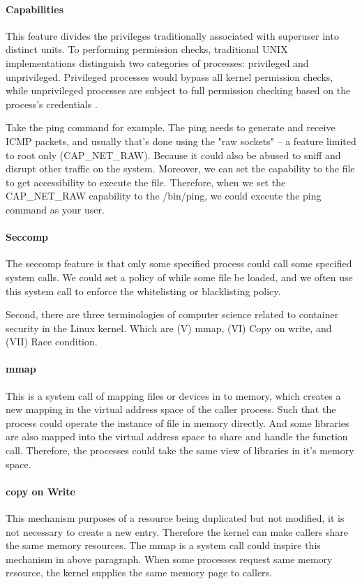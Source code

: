 \documentclass[12pt,a4paper]{article}
\begin{document}
\paragraph{Capabilities}
This feature divides the privileges traditionally associated with superuser into
distinct units. To performing permission checks, traditional UNIX
implementations distinguish two categories of processes: privileged and unprivileged.
Privileged processes would bypass all kernel permission checks, while unprivileged
processes are subject to full permission checking based on the process's credentials
\cite{capabilities}.

Take the ping command for example. The ping needs to generate and receive ICMP packets,
and usually that's done using the "raw sockets" – a feature limited to root only
(CAP\_NET\_RAW). Because it could also be abused to sniff and disrupt other traffic
on the system. Moreover, we can set the capability to the file to get accessibility
to execute the file.
Therefore, when we set the CAP\_NET\_RAW capability to the /bin/ping, we could execute
the ping command as your user.

\paragraph{Seccomp}
The seccomp feature is that only some specified process could call some specified
system calls. We could set a policy of while some file be loaded, and we often use
this system call to enforce the whitelisting or blacklisting policy.

Second, there are three terminologies of computer science related to container
security in the Linux kernel. Which are (\RN{5}) mmap, (\RN{6}) Copy on write,
and (\RN{7}) Race condition.

\paragraph{mmap}
This is a system call of mapping files or devices in to memory, which creates a
new mapping in the virtual address space of the caller process. Such that
the process could operate the instance of file in memory directly.
And some libraries are also mapped into the virtual address space to share and handle
the function call. Therefore, the processes could take the same view of libraries in
it's memory space.

\paragraph{copy on Write}
This mechanism purposes of a resource being duplicated but not modified, it is not
necessary to create a new entry. Therefore the kernel can make callers share
the same memory resources. The mmap is a system call could inspire this mechanism
in above paragraph. When some processes request same memory resource, the kernel
supplies the same memory page to callers.
\end{document}
